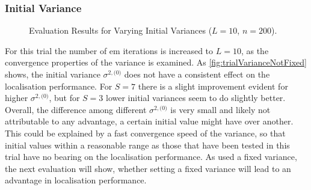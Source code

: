 \subsubsection*{Initial Variance}

\begin{figure}[H]
\iftoggle{quick}{
    \texttt{[image: plots/boxplots/boxplot-joined-var-val-est]}
}{%
    
}
	\caption[Evaluation Results for Varying Initial Variances]{Evaluation Results for Varying Initial Variances ($L=10$, $n=200$).}
	\label{fig:trialVarianceNotFixed}
\end{figure}

For this trial the number of \gls{em} iterations is increased to $L=10$, as the convergence properties of the variance is examined. As \autoref{fig:trialVarianceNotFixed} shows, the initial variance $\sigma^{2, \text{(0)}}$ does not have a consistent effect on the localisation performance. For $S=7$ there is a slight improvement evident for higher $\sigma^{2, \text{(0)}}$, but for $S=3$ lower initial variances seem to do slightly better. Overall, the difference among different $\sigma^{2, \text{(0)}}$ is very small and likely not attributable to any advantage, a certain initial value might have over another. This could be explained by a fast convergence speed of the variance, so that initial values within a reasonable range as those that have been tested in this trial have no bearing on the localisation performance. As \cite{Schwartz2014} used a fixed variance, the next evaluation will show, whether setting a fixed variance will lead to an advantage in localisation performance.